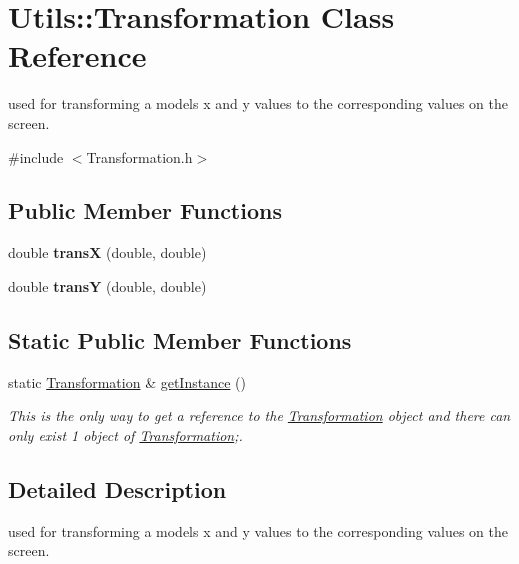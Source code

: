 \hypertarget{classUtils_1_1Transformation}{}\section{Utils\+:\+:Transformation Class Reference}
\label{classUtils_1_1Transformation}


used for transforming a models x and y values to the corresponding values on the screen.  




{\ttfamily \#include $<$Transformation.\+h$>$}

\subsection*{Public Member Functions}
\begin{DoxyCompactItemize}
\item 
\mbox{\label{classUtils_1_1Transformation_a4c04707895cb31f07f615c6d0dbd6691}} 
double {\bfseries transX} (double, double)
\item 
\mbox{\label{classUtils_1_1Transformation_a1b8c8966672f4182309a14b82a5af2cb}} 
double {\bfseries transY} (double, double)
\end{DoxyCompactItemize}
\subsection*{Static Public Member Functions}
\begin{DoxyCompactItemize}
\item 
static \hyperlink{classUtils_1_1Transformation}{Transformation} \& \hyperlink{classUtils_1_1Transformation_a03b9f5b948a515ced74861fa154a3ce4}{get\+Instance} ()
\begin{DoxyCompactList}\small\item\em This is the only way to get a reference to the \hyperlink{classUtils_1_1Transformation}{Transformation} object and there can only exist 1 object of \hyperlink{classUtils_1_1Transformation}{Transformation};. \end{DoxyCompactList}\end{DoxyCompactItemize}


\subsection{Detailed Description}
used for transforming a models x and y values to the corresponding values on the screen. 

